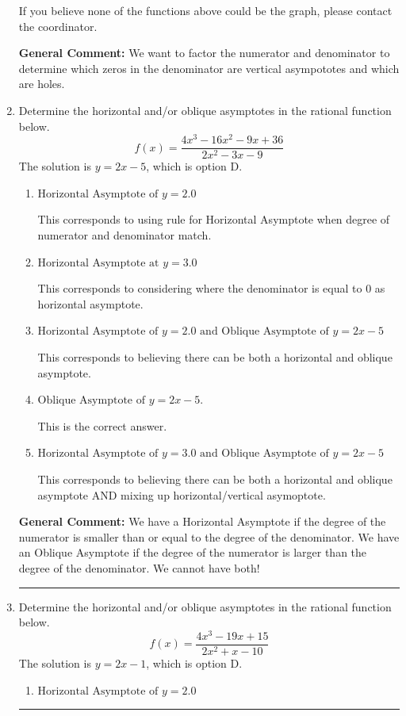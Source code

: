 \documentclass{extbook}[14pt]
\newcommand{\litem}[1]{\item #1

\rule{\textwidth}{0.4pt}}
\begin{document}
\begin{enumerate}
{\begin{enumerate}[label=\Alph*.]
If you believe none of the functions above could be the graph, please contact the coordinator.
\end{enumerate}

\textbf{General Comment:} We want to factor the numerator and denominator to determine which zeros in the denominator are vertical asympototes and which are holes.
}
\litem{
Determine the horizontal and/or oblique asymptotes in the rational function below.
\[ f(x) = \frac{4x^{3} -16 x^{2} -9 x + 36}{2x^{2} -3 x -9} \]The solution is \( y = 2x -5 \), which is option D.\begin{enumerate}[label=\Alph*.]
\item \( \text{Horizontal Asymptote of } y = 2.0  \)

This corresponds to using rule for Horizontal Asymptote when degree of numerator and denominator match.
\item \( \text{Horizontal Asymptote at } y = 3.0 \)

This corresponds to considering where the denominator is equal to 0 as horizontal asymptote.
\item \( \text{Horizontal Asymptote of } y = 2.0 \text{ and Oblique Asymptote of } y = 2x -5 \)

This corresponds to believing there can be both a horizontal and oblique asymptote.
\item \( \text{Oblique Asymptote of } y = 2x -5. \)

This is the correct answer.
\item \( \text{Horizontal Asymptote of } y = 3.0 \text{ and Oblique Asymptote of } y = 2x -5 \)

This corresponds to believing there can be both a horizontal and oblique asymptote AND mixing up horizontal/vertical asymoptote.
\end{enumerate}

\textbf{General Comment:} We have a Horizontal Asymptote if the degree of the numerator is smaller than or equal to the degree of the denominator. We have an Oblique Asymptote if the degree of the numerator is larger than the degree of the denominator. We cannot have both!
}
\litem{
Determine the horizontal and/or oblique asymptotes in the rational function below.
\[ f(x) = \frac{4x^{3} -19 x + 15}{2x^{2} +x -10} \]The solution is \( y = 2x -1 \), which is option D.\begin{enumerate}[label=\Alph*.]
\item \( \text{Horizontal Asymptote of } y = 2.0  \)


\end{enumerate}}
\end{enumerate}
\end{document}
